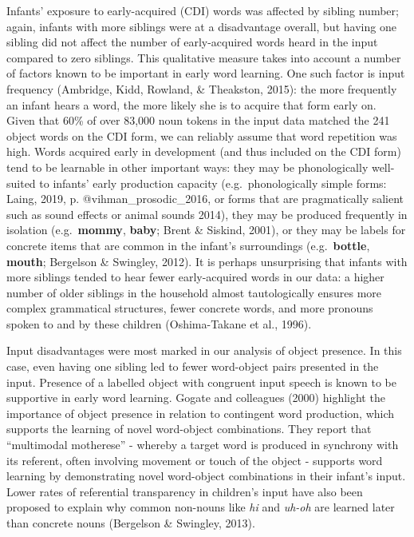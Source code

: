 \documentclass[
  english,
  man,floatsintext]{apa6}
\begin{document}
Infants' exposure to early-acquired (CDI) words was affected by sibling number; again, infants with more siblings were at a disadvantage overall, but having one sibling did not affect the number of early-acquired words heard in the input compared to zero siblings. This qualitative measure takes into account a number of factors known to be important in early word learning. One such factor is input frequency (Ambridge, Kidd, Rowland, \& Theakston, 2015): the more frequently an infant hears a word, the more likely she is to acquire that form early on. Given that 60\% of over 83,000 noun tokens in the input data matched the 241 object words on the CDI form, we can reliably assume that word repetition was high. Words acquired early in development (and thus included on the CDI form) tend to be learnable in other important ways: they may be phonologically well-suited to infants' early production capacity (e.g.~phonologically simple forms: Laing, 2019, p. @vihman\_prosodic\_2016, or forms that are pragmatically salient such as sound effects or animal sounds 2014), they may be produced frequently in isolation (e.g.~\textbf{mommy}, \textbf{baby}; Brent \& Siskind, 2001), or they may be labels for concrete items that are common in the infant's surroundings (e.g.~\textbf{bottle}, \textbf{mouth}; Bergelson \& Swingley, 2012). It is perhaps unsurprising that infants with more siblings tended to hear fewer early-acquired words in our data: a higher number of older siblings in the household almost tautologically ensures more complex grammatical structures, fewer concrete words, and more pronouns spoken to and by these children (Oshima-Takane et al., 1996).

Input disadvantages were most marked in our analysis of object presence. In this case, even having one sibling led to fewer word-object pairs presented in the input. Presence of a labelled object with congruent input speech is known to be supportive in early word learning. Gogate and colleagues (2000) highlight the importance of object presence in relation to contingent word production, which supports the learning of novel word-object combinations. They report that \enquote{multimodal motherese} - whereby a target word is produced in synchrony with its referent, often involving movement or touch of the object - supports word learning by demonstrating novel word-object combinations in their infant's input. Lower rates of referential transparency in children's input have also been proposed to explain why common non-nouns like \emph{hi} and \emph{uh-oh} are learned later than concrete nouns (Bergelson \& Swingley, 2013).
\end{document}
